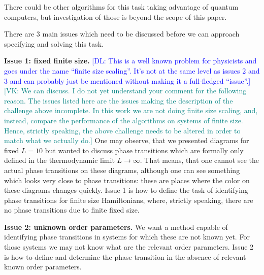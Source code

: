 \documentclass[american,aps,pra,reprint,floatfix,nofootinbib,superscriptaddress]{revtex4-2}
\newcommand{\VK}[1]{\textcolor{teal}{[VK: #1]}}
\newcommand{\DL}[1]{\textcolor{blue}{[DL: #1]}}
\begin{document}
\begin{center}
\end{center}

There could be other algorithms for this task taking advantage of
quantum computers, but investigation of those is beyond the scope of this
paper.

There are 3 main issues which need to be discussed before we can approach
specifying and solving this task.

\textbf{Issue 1: fixed finite size.}
\DL{This is a well known problem for physicists and goes under the name ``finite size scaling''. It's not at the same level as issues 2 and 3 and can probably just be mentioned without making it a full-fledged ``issue''.}
\VK{We can discuss. I do not yet understand your
comment for the following reason. The issues listed
here are the issues making the description of the
challenge above incomplete. In this work we are
not doing finite size scaling, and, instead,
compare the performance of the algorithms on
systems of finite size. Hence, strictly speaking,
the above challenge needs to be altered in order
to match what we actually do.}
One may observe, that we presented diagrams for fixed $L=10$ but wanted to
discuss phase transitions which are formally only defined in the thermodynamic
limit $L\to\infty$. That means, that one cannot see the actual phase transitions
on these diagrams, although one can see something which looks very close to
phase transitions: these are places where the color on these diagrams
changes quickly. Issue 1 is how to define the task of identifying
phase transitions for finite size Hamiltonians, where, strictly speaking,
there are no phase transitions due to finite fixed size.

\textbf{Issue 2: unknown order parameters.}
We want a method capable of identifying phase transitions in systems
for which these are not known yet. For those systems we may not know
what are the relevant order parameters. Issue 2 is how to define and
determine the phase transition in the absence of relevant known order parameters.
\end{document}

